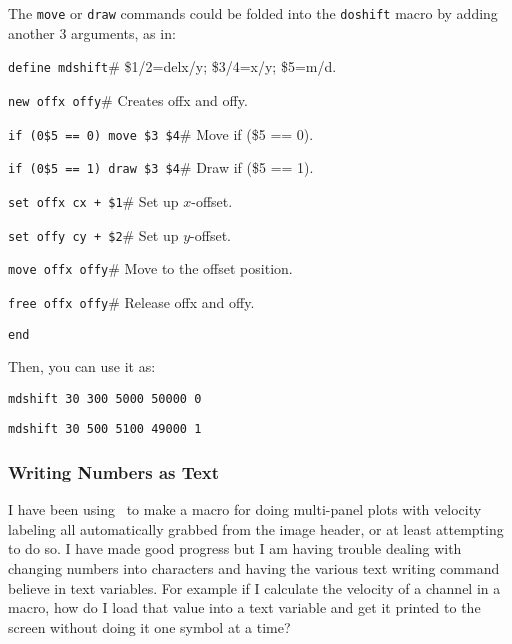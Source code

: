 The {\tt move} or {\tt draw} commands could be folded into
the {\tt doshift} macro by adding another 3 arguments, as in:
\begin{wiplist}%
  \item {\tt define mdshift}\hfill\# \$1/2=delx/y; \$3/4=x/y; \$5=m/d.
\samepage
  \item [\wipd] {\tt new offx offy}\hfill\# Creates offx and offy.
  \item [\wipd] {\tt if (0\$5 == 0) move \$3 \$4}\hfill\# Move if (\$5 == 0).
  \item [\wipd] {\tt if (0\$5 == 1) draw \$3 \$4}\hfill\# Draw if (\$5 == 1).
  \item [\wipd] {\tt set offx cx + \$1}\hfill\# Set up $x$-offset.
  \item [\wipd] {\tt set offy cy + \$2}\hfill\# Set up $y$-offset.
  \item [\wipd] {\tt move offx offy}\hfill\# Move to the offset position.
  \item [\wipd] {\tt free offx offy}\hfill\# Release offx and offy.
  \item [\wipd] {\tt end}
\end{wiplist}
Then, you can use it as:
\begin{wiplist}%
  \item {\tt mdshift 30 300 5000 50000 0}
\samepage
  \item {\tt mdshift 30 500 5100 49000 1}
\end{wiplist}

\subsubsection*         {Writing Numbers as Text}

I have been using \wip\ to make a macro for doing multi-panel
plots with velocity labeling all automatically grabbed
from the image header, or at least attempting to do so.
I have made good progress but I am having trouble dealing with
changing numbers into characters and having the various text
writing command believe in text variables.
For example if I calculate the velocity of a channel in a macro,
how do I load that value into a text variable and get
it printed to the screen without doing it one symbol at a time?

